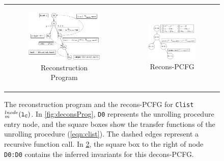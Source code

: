 \begin{figure}
\begin{tabular}{cc}
\begin{subfigure}[b]{0.50\textwidth}
\includegraphics[scale=0.75]{chapters/figures/figClistCfg.pdf}
\caption{\label{fig:reconsProg}Reconstruction Program}
\end{subfigure}%
&
\begin{subfigure}[b]{0.50\textwidth}
\includegraphics[scale=0.75]{chapters/figures/figClistProductCfg.pdf}
\caption{\label{fig:reconsPCFG}Recons-PCFG}
\end{subfigure}%
\\
\end{tabular}
\vspace{-8px}
\caption{\label{fig:recons}The reconstruction program and the recons-PCFG for {\tt Clist$^{lnode}_m({\tt l_{C}})$}. In \cref{fig:deconsProg}, {\tt D0} represents the unrolling procedure entry node, and the square boxes show the transfer functions of the unrolling procedure (\cref{eqn:clist}). The dashed edges represent a recursive function call. In \cref{fig:reconsPCFG}, the square box to the right of node {\tt D0:D0} contains the inferred invariants for this decons-PCFG.}
\vspace{-8px}
\end{figure}
